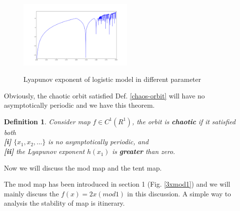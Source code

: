 \documentclass[12pt]{article}
\theoremstyle{plain}
\newtheorem{definition}{{\color{red}\textbf{Definition}}}[section]
\begin{document}
\begin{figure}[H]
\begin{center}
\includegraphics[width=0.5\textwidth]{figure/section3/logistic-lyapunov-exp.png} \\
\caption{Lyapunov exponent of logistic model in different parameter}\label{logistic-lyapunov-exp}
\end{center}
\end{figure}


Obviously, the chaotic orbit satisfied Def. \ref{chaos-orbit} will have no asymptotically periodic and we have this theorem.


\begin{definition}\label{Lyapunov-exponent-chaotic} Consider map $f \in C^1(R^1)$, the orbit is \textbf{chaotic} if it satisfied both
\\\noindent \textbf{[i]} $\{x_1, x_2, \ldots \}$ is no asymptotically periodic, and
\\\noindent \textbf{[ii]} the Lyapunov exponent $h(x_1)$ is \textbf{greater} than zero.
\end{definition}









Now we will discuss the mod map and the tent map.

The mod map has been introduced in section 1 (Fig. \ref{3xmod1}) and we will mainly discuss the $f(x) = 2x (mod 1)$ in this discussion. A simple way to analysis the stability of map is itinerary.\\[3ex]
\end{document}
